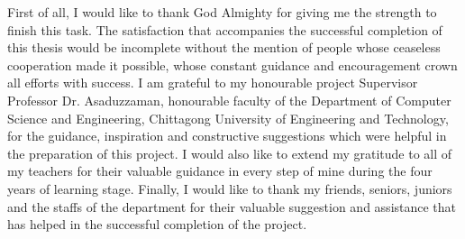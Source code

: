 \begin{acknowledgements}
First of all, I would like to thank God Almighty for giving me the strength to finish this task. The satisfaction that accompanies the successful completion of this thesis would be incomplete without the mention of people whose ceaseless cooperation made it possible, whose constant guidance and encouragement crown all efforts with success. I am grateful to my honourable project Supervisor Professor Dr. Asaduzzaman, honourable faculty of the Department of Computer Science and Engineering, Chittagong University of Engineering and Technology, for the guidance, inspiration and constructive suggestions which were helpful in the preparation of this project. I would also like to extend my gratitude to all of my teachers for their valuable guidance in every step of mine during the four years of learning stage. Finally, I would like to thank my friends, seniors, juniors and the staffs of the department for their valuable suggestion and assistance that has helped in the successful completion of the project.

\end{acknowledgements}